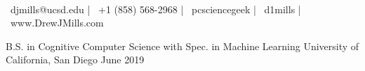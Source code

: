 \documentclass[]{awesome-cv}
\begin{document}
\begin{center}
	  \\
	\vspace{2mm}
	{\faEnvelope\ djmills@ucsd.edu} | {\faMobile\ +1 (858) 568-2968} | {\faGithub\ pcsciencegeek} |  {\faLinkedinSquare\ d1mills} | {\faInternetExplorer\ www.DrewJMills.com}
\end{center}
\begin{cventries}
	\cventry
	{B.S. in Cognitive Computer Science with Spec. in Machine Learning}
	{University of California, San Diego} 
	{}
	{June 2019}
	{}
\end{cventries}
\end{document}
